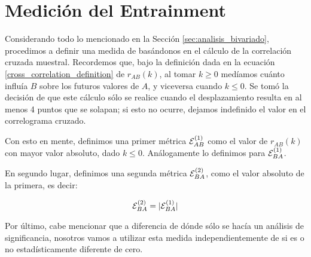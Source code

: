 \section{Medición del Entrainment}
\label{sec:method_entrainment}

Considerando todo lo mencionado en la Sección \ref{sec:analisis_bivariado}, procedimos a definir una medida de \entrainment basándonos en el cálculo de la correlación cruzada muestral. Recordemos que, bajo la definición dada en la ecuación \ref{cross_correlation_definition} de $r_{AB}(k)$, al tomar $k \geq 0$ medíamos cuánto influía $B$ sobre los futuros valores de $A$, y viceversa cuando $k \leq 0$. Se tomó la decisión de que este cálculo sólo se realice cuando el desplazamiento resulta en al menos 4 puntos que se solapan; si esto no ocurre, dejamos indefinido el valor en el correlograma cruzado.

Con esto en mente, definimos una primer métrica $\mathcal{E}_{AB}^{(1)}$ como el valor de $r_{AB}(k)$ con mayor valor absoluto, dado $k \leq 0$. Análogamente lo definimos para $\mathcal{E}_{BA}^{(1)}$.

En segundo lugar, definimos una segunda métrica $\mathcal{E}_{BA}^{(2)}$, como el valor absoluto de la primera, es decir:

\begin{equation}
\mathcal{E}_{BA}^{(2)} = |\mathcal{E}_{BA}^{(1)}|
\end{equation}

Por último, cabe mencionar que a diferencia de \cite{KOU2008.2} dónde sólo se hacía un análisis de significancia, nosotros vamos a utilizar esta medida independientemente de si es o no estadísticamente diferente de cero.
